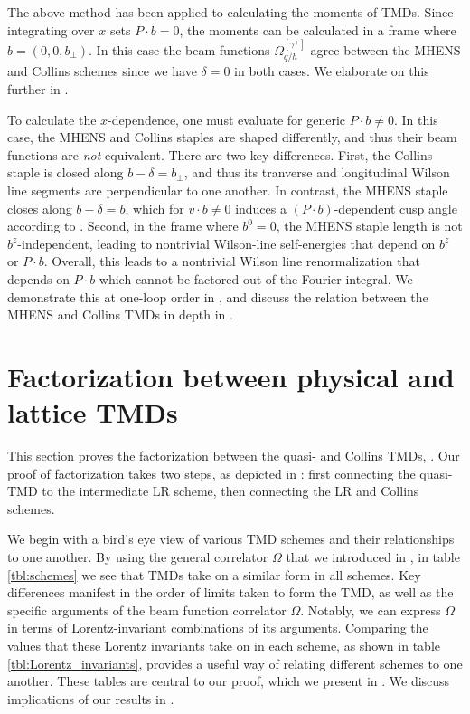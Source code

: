 \documentclass[11pt,a4paper]{article}
\newcommand{\Corr}{\Omega}
\begin{document}
The above method has been applied to calculating the moments of TMDs.
Since integrating over $x$ sets $P \cdot b = 0$, the moments can be calculated
in a frame where $b = (0, 0, b_\perp)$. In this case
the beam functions $\Corr_{q/h}^{[\gamma^+]}$ agree between the MHENS and Collins schemes since we have $\delta=0$ in both cases.  We elaborate on this further in .

To calculate the $x$-dependence, one must evaluate 
for generic $P \cdot b\neq0$. 
In this case, the MHENS and Collins staples are shaped differently, and thus their beam functions are \emph{not} equivalent.
There are two key differences.
First, the Collins staple is closed along $b - \delta = b_\perp$,
and thus its tranverse and longitudinal Wilson line segments are perpendicular to one another.
In contrast, the MHENS staple closes along $b - \delta = b$,
which for $v\cdot b \ne 0$ induces a $(P\cdot b)$-dependent cusp angle according to .
Second, in the frame where $b^0=0$, the MHENS staple length is not $b^z$-independent,
leading to nontrivial Wilson-line self-energies that depend on $b^z$ or $P\cdot b$.
Overall, this leads to a nontrivial Wilson line renormalization that depends on $P\cdot b$
which cannot be factored out of the Fourier integral.
We demonstrate this at one-loop order in , and discuss the relation between the MHENS and Collins TMDs in depth in .



\section{Factorization between physical and lattice TMDs}
\label{sec:proof}
This section proves the factorization between the quasi- and Collins TMDs, .
Our proof of factorization takes two steps, as depicted in : first connecting the quasi-TMD to the intermediate LR scheme, then connecting the LR and Collins schemes. 

We begin with a bird's eye view of various TMD schemes and their relationships to one another.
By using the general correlator $\Corr$ that we introduced in , in table \ref{tbl:schemes} we see that TMDs take on a similar form in all schemes.
Key differences manifest in the order of limits taken to form the TMD, as well as the specific arguments of the beam function correlator $\Corr$.
Notably, we can express $\Corr$ in terms of Lorentz-invariant combinations of its arguments.
Comparing the values that these Lorentz invariants take on in each scheme, as shown in table \ref{tbl:Lorentz_invariants}, provides a useful way of relating different schemes to one another.
These tables are central to our proof, which we present in .
We discuss implications of our results in .
 
\end{document}
